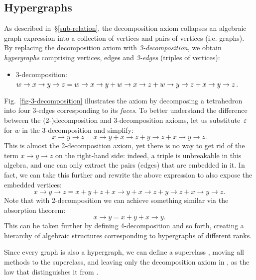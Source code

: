 \subsection{Hypergraphs}\label{sub-hypergraphs}

As described in~\S\ref{sub-relation}, the decomposition axiom collapses an algebraic
graph expression into a collection of vertices and pairs of vertices (i.e. graphs).
By replacing the decomposition axiom with \emph{3-decomposition}, we obtain
\emph{hypergraphs} comprising vertices, edges and \emph{3-edges} (triples of vertices):

\begin{itemize}
    \item 3-decomposition: $w \rightarrow x \rightarrow y \rightarrow z = \\
    w \rightarrow x \rightarrow y + w \rightarrow x \rightarrow z +
    w \rightarrow y \rightarrow z + x \rightarrow y \rightarrow z$.
\end{itemize}

Fig.~\ref{fig-3-decomposition} illustrates the axiom by decomposing a tetrahedron
into four 3-edges corresponding to its \emph{faces}. To better understand the
difference between the (2-)decomposition and 3-decomposition
axioms, let us substitute~$\varepsilon$ for $w$ in the 3-decomposition and simplify:
\[
x \rightarrow y \rightarrow z = x \rightarrow y + x \rightarrow z + y \rightarrow z
+ x \rightarrow y \rightarrow z.
\]
This is almost the 2-decomposition axiom, yet there is no way to get rid
of the term $x \rightarrow y \rightarrow z$ on the right-hand side: indeed, a triple is
unbreakable
in this algebra, and one can only extract the pairs (edges) that are embedded in it.
In fact, we can take this further and rewrite the above expression to also expose the
embedded vertices:
\[
x \rightarrow y \rightarrow z = x + y + z + x \rightarrow y + x \rightarrow z
+ y \rightarrow z + x \rightarrow y \rightarrow z.
\]
Note that with 2-decomposition we can achieve something similar via the absorption theorem:
\[
x \rightarrow y = x + y + x \rightarrow y.
\]
This can be taken further by defining 4-decomposition and so forth, creating a hierarchy
of algebraic structures corresponding to hypergraphs of different ranks.

Since every graph is also a hypergraph, we can define a superclass
, moving all  methods to the superclass, and
leaving only the decomposition axiom in , as the law that distinguishes it from
.

